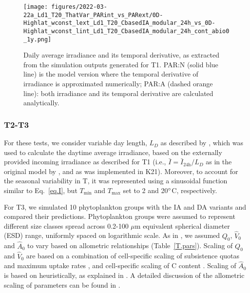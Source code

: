 \documentclass[gmd, manuscript]{copernicus}
\newcommand{\onur}[1]{\textcolor{blue}{\{Onur: #1\}}}
\begin{document}
    \begin{figure}[ht!]
    \texttt{[image: figures/2022-03-22a\_Ld1\_T20\_ThatVar\_PARint\_vs\_PARext/0D-Highlat\_wconst\_lext\_Ld1\_T20\_CbasedIA\_modular\_24h\_vs\_0D-Highlat\_wconst\_lint\_Ld1\_T20\_CbasedIA\_modular\_24h\_cont\_abio0\_1y.png]}
    \caption{Daily average irradiance and its temporal derivative, as extracted from the simulation outputs generated for T1. PAR:N (solid blue line) is the model version where the temporal derivative of irradiance is approximated numerically; PAR:A (dashed orange line): both irradiance and its temporal derivative are calculated analytically.\label{f.T1light}}
    \end{figure}

    \subsubsection{T2-T3}
    For these tests, we consider variable day length, $L_D$ as described by \citet{Forsythe2003}, which was used to calculate the daytime average irradiance, based on the externally provided incoming irradiance as described for T1 (i.e., $\bar{I}=\bar{I}_{\text{24h}}/L_D$ as in the original model by \citep{Pahlowetal13}, and as was implemented in K21). Moreover, to account for the seasonal variability in T, it was represented using a sinusoidal function similar to Eq.~\ref{eq.I}, but $T_{\min}$ and $T_{\max}$ set to 2 and 20$^{\circ}$C, respectively.
    
    For T3, we simulated 10 phytoplankton groups with the IA and DA variants and compared their predictions. Phytoplankton groups were assumed to represent different size classes spread across 0.2-100 $\mu$m equivalent spherical diameter (ESD) range, uniformly spaced on logarithmic scale. As in \citet{Smith2016}, we assumed 
    $Q_0$, $\hat{V}_0$ and $\hat{A}_0$ to vary based on allometric relationships  (Table~\ref{T.pars}). Scaling of $Q_0$ and $\hat{V}_0$ are based on a combination of cell-specific scaling of subsistence quotas \citep[][`marine species']{Edwards2012} and maximum uptake rates \citep{Maranon2013}, and cell-specific scaling of C content \citep[][`protist plankton excluding diatoms']{Menden2000}. Scaling of $\hat{A}_0$ is based on heuristically, as explained in \citet{Smith2014a}. A detailed discussion of the allometric scaling of parameters can be found in \citet{Smith2016}.
    
\end{document}
